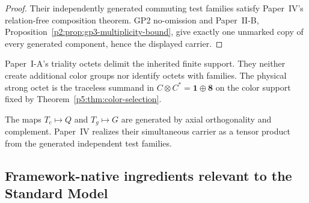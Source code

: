 \documentclass[12pt,a4paper]{article}
\begin{document}
\begin{proof}
Their independently generated commuting test families satisfy Paper~IV's
relation-free composition theorem.  GP2 no-omission and Paper~II-B,
Proposition~\ref{p2:prop:gp3-multiplicity-bound}, give exactly one unmarked
copy of every generated component, hence the displayed carrier.
\end{proof}

\begin{remark}
\label{p5:rem:triality-octets-support-not-gauge}
Paper~I-A's triality octets delimit the inherited finite support.  They neither create additional color groups nor identify octets with families.  The physical strong octet is the traceless summand in \(C\otimes C^\ast=\mathbf1\oplus\mathbf8\) on the color support fixed by Theorem~\ref{p5:thm:color-selection}.
\end{remark}



\begin{remark}
\label{p5:rem:paper5-support-selections}
The maps \(T_c\mapsto Q\) and \(T_g\mapsto G\) are generated by axial
orthogonality and complement.  Paper~IV realizes their simultaneous carrier
as a tensor product from the generated independent test families.
\end{remark}

\subsection{Framework-native ingredients relevant to the Standard Model}
\label{p5:sec:part1-native}
\end{document}
